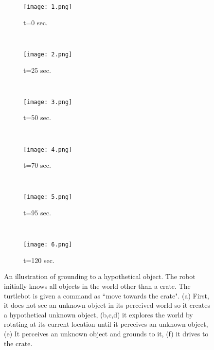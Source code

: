 \begin{figure*}
\begin{subfigure}[b]{0.15\textwidth}
\centering
\texttt{[image: 1.png]}
\caption{t=0 sec.}
\label{fig:g_acc}
\end{subfigure}
~
\begin{subfigure}[b]{0.15\textwidth}
\centering
\texttt{[image: 2.png]}
\caption{t=25 sec.}
\label{fig:symbols}
\end{subfigure}
~
\begin{subfigure}[b]{0.15\textwidth}
\centering
\texttt{[image: 3.png]}
\caption{t=50 sec.}
\label{fig:g_acc_split}
\end{subfigure}
~
\begin{subfigure}[b]{0.15\textwidth}
\centering
\texttt{[image: 4.png]}
\caption{t=70 sec.}
\label{fig:g_acc}
\end{subfigure}
~
\begin{subfigure}[b]{0.15\textwidth}
\centering
\texttt{[image: 5.png]}
\caption{t=95 sec.}
\label{fig:symbols}
\end{subfigure}
~
\begin{subfigure}[b]{0.15\textwidth}
\centering
\texttt{[image: 6.png]}
\caption{t=120 sec. }
\label{fig:g_acc_split}
\end{subfigure}
\caption{An illustration of grounding to a hypothetical object. The robot initially knows all objects in the world other than a crate. The turtlebot is given a command as ``move towards the crate". (a) First, it does not see an unknown object in its perceived world so it creates a hypothetical unknown object, (b,c,d) it explores the world by rotating at its current location until it perceives an unknown object, (e) It perceives an unknown object and grounds to it, (f) it drives to the crate.}
\label{fig:crate}
\end{figure*}



